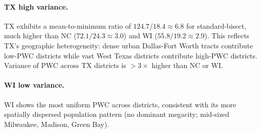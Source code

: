 \paragraph{TX high variance.}
TX exhibits a mean-to-minimum ratio of $124.7 / 18.4 \approx 6.8$ for standard-bisect,
much higher than NC ($72.1 / 24.3 \approx 3.0$) and WI ($55.8 / 19.2 \approx 2.9$).
This reflects TX's geographic heterogeneity: dense urban Dallas-Fort Worth
tracts contribute low-PWC districts while vast West Texas districts contribute
high-PWC districts.
Variance of PWC across TX districts is $> 3\times$ higher than NC or WI.

\paragraph{WI low variance.}
WI shows the most uniform PWC across districts, consistent with its more
spatially dispersed population pattern (no dominant megacity; mid-sized
Milwaukee, Madison, Green Bay).

